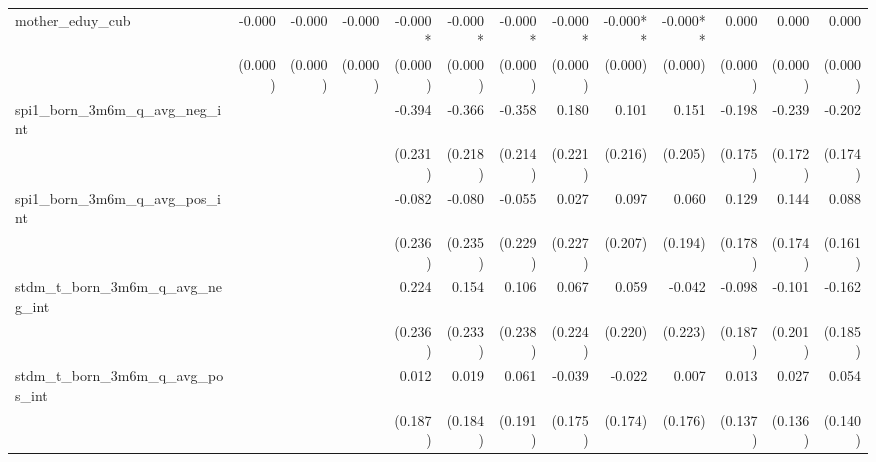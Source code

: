\begin{tabular}{lrrrrrrrrrrrr}
mother\_eduy\_cub                           &       -0.000 &       -0.000 &       -0.000 &      -0.000* &      -0.000* &      -0.000* &      -0.000* &     -0.000** &     -0.000** &        0.000 &        0.000 &        0.000 \\ 
                                            &      (0.000) &      (0.000) &      (0.000) &      (0.000) &      (0.000) &      (0.000) &      (0.000) &      (0.000) &      (0.000) &      (0.000) &      (0.000) &      (0.000) \\ 
spi1\_born\_3m6m\_q\_avg\_neg\_int          &              &              &              &       -0.394 &       -0.366 &       -0.358 &        0.180 &        0.101 &        0.151 &       -0.198 &       -0.239 &       -0.202 \\ 
                                            &              &              &              &      (0.231) &      (0.218) &      (0.214) &      (0.221) &      (0.216) &      (0.205) &      (0.175) &      (0.172) &      (0.174) \\ 
spi1\_born\_3m6m\_q\_avg\_pos\_int          &              &              &              &       -0.082 &       -0.080 &       -0.055 &        0.027 &        0.097 &        0.060 &        0.129 &        0.144 &        0.088 \\ 
                                            &              &              &              &      (0.236) &      (0.235) &      (0.229) &      (0.227) &      (0.207) &      (0.194) &      (0.178) &      (0.174) &      (0.161) \\ 
stdm\_t\_born\_3m6m\_q\_avg\_neg\_int       &              &              &              &        0.224 &        0.154 &        0.106 &        0.067 &        0.059 &       -0.042 &       -0.098 &       -0.101 &       -0.162 \\ 
                                            &              &              &              &      (0.236) &      (0.233) &      (0.238) &      (0.224) &      (0.220) &      (0.223) &      (0.187) &      (0.201) &      (0.185) \\ 
stdm\_t\_born\_3m6m\_q\_avg\_pos\_int       &              &              &              &        0.012 &        0.019 &        0.061 &       -0.039 &       -0.022 &        0.007 &        0.013 &        0.027 &        0.054 \\ 
                                            &              &              &              &      (0.187) &      (0.184) &      (0.191) &      (0.175) &      (0.174) &      (0.176) &      (0.137) &      (0.136) &      (0.140) \\ 

\end{tabular}
